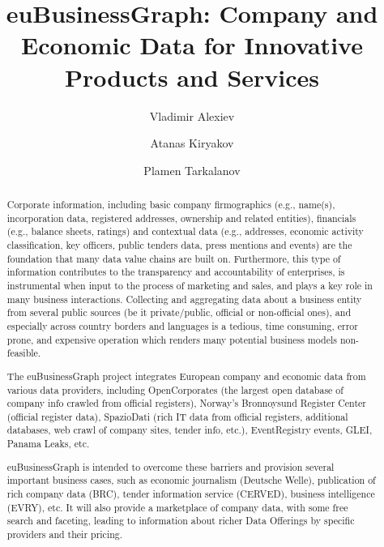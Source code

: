 \documentclass[runningheads,a4paper]{llncs}
\begin{document}
\mainmatter

\title{euBusinessGraph: Company and Economic Data for Innovative Products and Services}
\author{Vladimir Alexiev \and
Atanas Kiryakov \and
Plamen Tarkalanov}
\maketitle

\begin{abstract}
Corporate information, including basic company firmographics (e.g., name(s), incorporation data, registered addresses, ownership and related entities), financials (e.g., balance sheets, ratings) and contextual data (e.g., addresses, economic activity classification, key officers, public tenders data, press mentions and events) are the foundation that many data value chains are built on. Furthermore, this type of information contributes to the transparency and accountability of enterprises, is instrumental when input to the process of marketing and sales, and plays a key role in many business interactions. Collecting and aggregating data about a business entity from several public sources (be it private/public, official or non-official ones), and especially across country borders and languages is a tedious, time consuming, error prone, and expensive operation which renders many potential business models non-feasible.

The euBusinessGraph project integrates European company and economic data from various data providers, including OpenCorporates (the largest open database of company info crawled from official registers), Norway's Bronnoysund Register Center (official register data), SpazioDati (rich IT data from official registers, additional databases, web crawl of company sites, tender info, etc.), EventRegistry events, GLEI, Panama Leaks, etc.

euBusinessGraph is intended to overcome these barriers and provision several important business cases, such as economic journalism (Deutsche Welle), publication of rich company data (BRC), tender information service (CERVED), business intelligence (EVRY), etc. It will also provide a marketplace of company data, with some free search and faceting, leading to information about richer Data Offerings by specific providers and their pricing.


\end{abstract}
\end{document}
